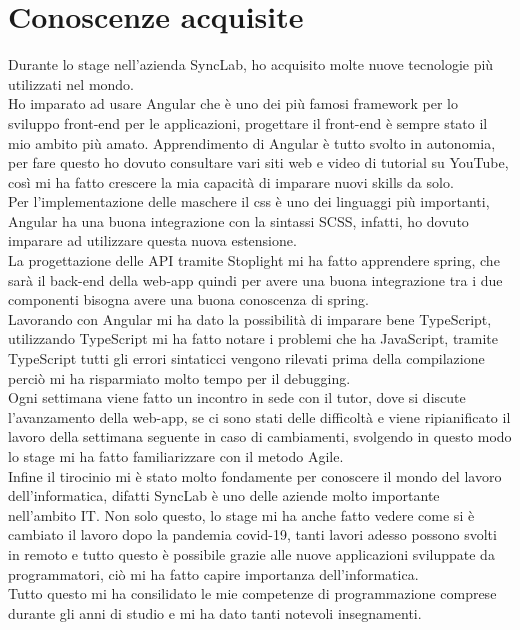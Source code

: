 \section{Conoscenze acquisite}
Durante lo stage nell'azienda SyncLab, ho acquisito molte nuove tecnologie più utilizzati nel mondo.\\
Ho imparato ad usare Angular che è uno dei più famosi framework per lo sviluppo front-end per le applicazioni, progettare il front-end è sempre stato il mio ambito più amato. Apprendimento di Angular è tutto svolto in autonomia, per fare questo ho dovuto consultare vari siti web e video di tutorial su YouTube, così mi ha fatto crescere la mia capacità di imparare nuovi skills da solo.\\
Per l'implementazione delle maschere il css è uno dei linguaggi più importanti, Angular ha una buona integrazione con la sintassi SCSS, infatti, ho dovuto imparare ad utilizzare questa nuova estensione.\\
La progettazione delle API tramite Stoplight mi ha fatto apprendere spring, che sarà il back-end della web-app quindi per avere una buona integrazione tra i due componenti bisogna avere una buona conoscenza di spring.\\
Lavorando con Angular mi ha dato la possibilità di imparare bene TypeScript, utilizzando TypeScript mi ha fatto notare i problemi che ha JavaScript, tramite TypeScript tutti gli errori sintaticci vengono rilevati prima della compilazione perciò mi ha risparmiato molto tempo per il debugging.\\
Ogni settimana viene fatto un incontro in sede con il tutor, dove si discute l'avanzamento della web-app, se ci sono stati delle difficoltà e viene ripianificato il lavoro della settimana seguente in caso di cambiamenti, svolgendo in questo modo lo stage mi ha fatto familiarizzare con il metodo Agile.\\
Infine il tirocinio mi è stato molto fondamente per conoscere il mondo del lavoro dell'informatica, difatti SyncLab è uno delle aziende molto importante nell'ambito IT. Non solo questo, lo stage mi ha anche fatto vedere come si è cambiato il lavoro dopo la pandemia covid-19, tanti lavori adesso possono svolti in remoto e tutto questo è possibile grazie alle nuove applicazioni sviluppate da programmatori, ciò mi ha fatto capire importanza dell'informatica.\\
Tutto questo mi ha consilidato le mie competenze di programmazione comprese durante gli anni di studio e mi ha dato tanti notevoli insegnamenti.

